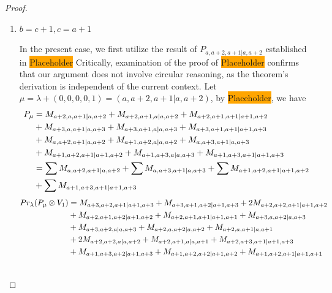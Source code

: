 \begin{proof}
\begin{enumerate}
\begin{enumerate}
        \item $b=c+1,c=a+1$ \par
        In the present case, we first utilize the result of $P_{a,a+2,a+1|a,a+2}$ established in \colorbox{orange}{Placeholder} Critically, examination of the proof of \colorbox{orange}{Placeholder} confirms that our argument does not involve circular reasoning, as the theorem's derivation is independent of the current context. Let $\mu = \lambda + (0,0,0,0,1) =(a,a+2,a+1|a,a+2) $, by \colorbox{orange}{Placeholder}, we have
        \begin{equation}\notag
          \begin{aligned}
            P_\mu &= 
M_{a+2,a,a+1|a,a+2}
+M_{a+2,a+1,a|a,a+2}
+M_{a+2,a+1,a+1|a+1,a+2}\\
                                              &
+M_{a+3,a,a+1|a,a+3}
+M_{a+3,a+1,a|a,a+3}
+M_{a+3,a+1,a+1|a+1,a+3}\\
                                              &
+M_{a,a+2,a+1|a,a+2}
+M_{a+1,a+2,a|a,a+2}
+M_{a,a+3,a+1|a,a+3}\\
                                              &
+M_{a+1,a+2,a+1|a+1,a+2}
+M_{a+1,a+3,a|a,a+3}
+M_{a+1,a+3,a+1|a+1,a+3}\\
                  &=
\sum M_{a,a+2,a+1|a,a+2}
+\sum M_{a,a+3,a+1|a,a+3}
+\sum M_{a+1,a+2,a+1|a+1,a+2}\\
                                              &
+\sum M_{a+1,a+3,a+1|a+1,a+3}
          \end{aligned}
        \end{equation}
        \begin{equation}\notag
          \begin{aligned}
            Pr_{\lambda}(P_\mu \otimes V_{1}) &=
M_{a+3,a+2,a+1|a+1,a+3}
+ M_{a+3,a+1,a+2|a+1,a+3}
+ 2M_{a+2,a+2,a+1|a+1,a+2}\\
                                              &
+ M_{a+2,a+1,a+2|a+1,a+2}
+ M_{a+2,a+1,a+1|a+1,a+1}
+ M_{a+3,a,a+2|a,a+3}\\
                                              &
+ M_{a+3,a+2,a|a,a+3}
+ M_{a+2,a,a+2|a,a+2}
+ M_{a+2,a,a+1|a,a+1}\\
                                              &
+ 2M_{a+2,a+2,a|a,a+2}
+ M_{a+2,a+1,a|a,a+1}
+ M_{a+2,a+3,a+1|a+1,a+3}\\
                                              &
+ M_{a+1,a+3,a+2|a+1,a+3}
+ M_{a+1,a+2,a+2|a+1,a+2}
+ M_{a+1,a+2,a+1|a+1,a+1}\\
                                              &

\end{aligned}
\end{equation}
\end{enumerate}
\end{enumerate}
\end{proof}
